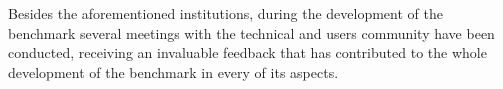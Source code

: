 \begin{figure}
\end{figure}

Besides the aforementioned institutions, during the development of the
benchmark several meetings with the technical and users community have been
conducted, receiving an invaluable feedback that has contributed to the whole
development of the benchmark in every of its aspects.


